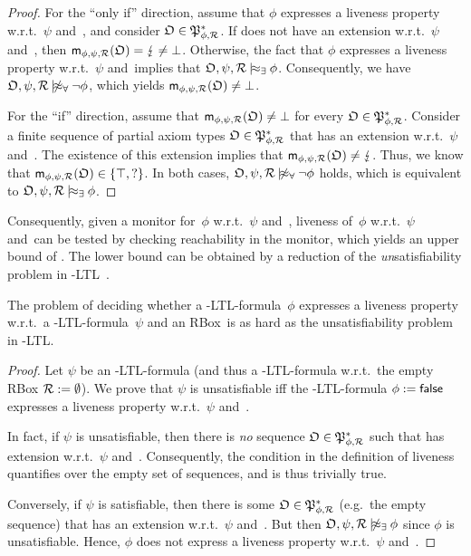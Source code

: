 \begin{proof}
    For the \enquote{only if} direction, assume that $\phi$ expresses a liveness
    property w.r.t.~$\psi$ and~\Rmc, and consider $\mathfrak{O}\in\mathfrak{P}_{\phi,\mathcal{R}}^*$.
    If \Omf does not have an extension w.r.t.~$\psi$ and~\Rmc, then
    $\mathsf{m}_{\phi,\psi,\mathcal{R}}(\mathfrak{O})=\lightning\ne\bot$.  Otherwise, the fact that
    $\phi$ expresses a liveness property w.r.t.~$\psi$ and~\Rmc implies that
    $\Omf,\psi,\Rmc\modelsex\phi$.  Consequently, we have
    $\Omf,\psi,\Rmc\notmodelsal\lnot\phi$, which yields
    $\mathsf{m}_{\phi,\psi,\mathcal{R}}(\mathfrak{O})\ne\bot$.

    For the \enquote{if} direction, assume that
    $\mathsf{m}_{\phi,\psi,\mathcal{R}}(\mathfrak{O})\ne\bot$ for every $\mathfrak{O}\in\mathfrak{P}_{\phi,\mathcal{R}}^*$.
    Consider a finite sequence of partial axiom types
    $\mathfrak{O}\in\mathfrak{P}_{\phi,\mathcal{R}}^*$ that has an extension w.r.t.~$\psi$ and~\Rmc.
    The existence of this extension implies that
    $\mathsf{m}_{\phi,\psi,\mathcal{R}}(\mathfrak{O})\ne\lightning$.  Thus, we know that
    $\mathsf{m}_{\phi,\psi,\mathcal{R}}(\mathfrak{O})\in\{\top,{?}\}$.  In both cases,
    $\Omf,\psi,\Rmc\notmodelsal\lnot\phi$ holds, which is equivalent to
    $\Omf,\psi,\Rmc\modelsex\phi$.
\end{proof}

\noindent
Consequently, given a monitor for~$\phi$ w.r.t.~$\psi$ and~\Rmc, liveness
of~$\phi$ w.r.t.~$\psi$ and~\Rmc can be tested by checking reachability in the
monitor, which yields an upper bound of \TwoExpTime.
%
The lower bound can be obtained by a reduction of the \emph{un}satisfiability
problem in \ALC-LTL~\cite{BaGL-ToCL12}.

\begin{lemma}\label{lem:liveness-lower}
    The problem of deciding whether a \SHOQ-LTL-formula~$\phi$ expresses a
    liveness property w.r.t.~a \SHOQ-LTL-formula~$\psi$ and an RBox~\Rmc is as
    hard as the unsatisfiability problem in \ALC-LTL\@.
\end{lemma}

\begin{proof}
    Let $\psi$ be an \ALC-LTL-formula (and thus a \SHOQ-LTL-formula w.r.t.\ the
    empty RBox $\mathcal{R}:=\emptyset$).  We prove that $\psi$ is unsatisfiable iff
    the \SHOQ-LTL-formula $\phi:=\mathsf{false}$ expresses a liveness property
    w.r.t.~$\psi$ and~\Rmc.

    In fact, if $\psi$ is unsatisfiable, then there is \emph{no} sequence
    $\mathfrak{O}\in\mathfrak{P}_{\phi,\mathcal{R}}^*$ such that \Omf has extension w.r.t.~$\psi$
    and~\Rmc.  Consequently, the condition in the definition of liveness
    quantifies over the empty set of sequences, and is thus trivially true.

    Conversely, if $\psi$ is satisfiable, then there is some
    $\mathfrak{O}\in\mathfrak{P}_{\phi,\mathcal{R}}^*$ (e.g.~the empty sequence) that has an extension
    w.r.t.~$\psi$ and~\Rmc.  But then $\Omf,\psi,\Rmc\notmodelsex\phi$ since
    $\phi$ is unsatisfiable.  Hence, $\phi$ does not express a liveness property
    w.r.t.~$\psi$ and~\Rmc.
\end{proof}

